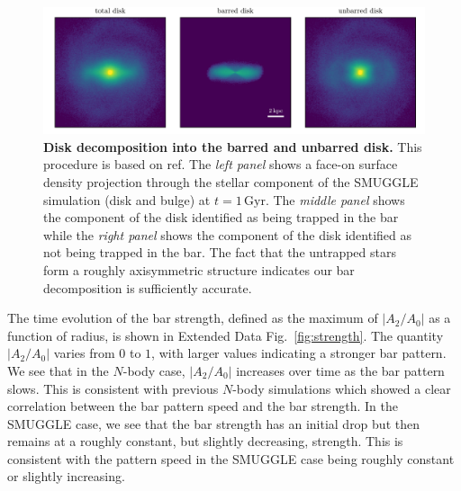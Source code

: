 \documentclass{natureprintstyle}
\newcommand{\Nbody}{$N$-body}
\newcommand{\SMUGGLE}{SMUGGLE}
\begin{document}
\begin{figure}[t!]%
\centering
\includegraphics[width=18cm]{fig/fig-bar.pdf}
\caption{\textbf{Disk decomposition into the barred and unbarred disk.} This
procedure is based on ref.\cite{2016MNRAS.463.1952P} The \textit{left panel}
shows a face-on surface density projection through the stellar component of the
\SMUGGLE{} simulation (disk and bulge) at $t=1\,\textrm{Gyr}$. The \textit{middle panel} shows the
component of the disk identified as being trapped in the bar while the
\textit{right panel} shows the component of the disk identified as not being
trapped in the bar. The fact that the untrapped stars form a roughly
axisymmetric structure indicates our bar decomposition is sufficiently
accurate.}
\label{fig:decomp}
\end{figure}

The time evolution of the bar strength, defined as the maximum of
$\left|A_2/A_0\right|$ as a function of radius, is shown in Extended Data
Fig.~\ref{fig:strength}. The quantity $\left|A_2/A_0\right|$ varies from $0$
to $1$, with larger values indicating a stronger bar pattern. We see that in
the \Nbody{} case, $\left|A_2/A_0\right|$ increases over time as the bar pattern
slows. This is consistent with previous \Nbody{} simulations which showed a
clear correlation between the bar pattern speed and the bar
strength.\cite{2003MNRAS.341.1179A} In the SMUGGLE case, we see that the bar
strength has an initial drop but then remains at a roughly constant, but
slightly decreasing, strength. This is consistent with the pattern speed in the
SMUGGLE case being roughly constant or slightly increasing.
\end{document}

